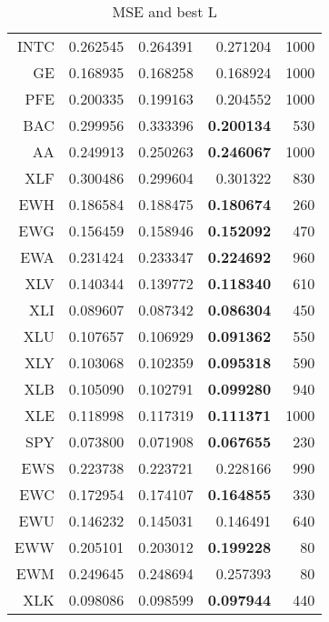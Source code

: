 \begin{table}[h!]
\begin{tabular}{*{5}{r}}
INTC  &  0.262545  &  0.264391  &  0.271204  &  1000\\
GE  &  0.168935  &  0.168258  &  0.168924  &  1000\\
PFE  &  0.200335  &  0.199163  &  0.204552  &  1000\\
BAC  &  0.299956  &  0.333396  &  \textbf{ 0.200134}  &  530\\
AA  &  0.249913  &  0.250263  &  \textbf{ 0.246067}  &  1000\\
XLF  &  0.300486  &  0.299604  &  0.301322  &  830\\
EWH  &  0.186584  &  0.188475  &  \textbf{ 0.180674}  &  260\\
EWG  &  0.156459  &  0.158946  &  \textbf{ 0.152092}  &  470\\
EWA  &  0.231424  &  0.233347  &  \textbf{ 0.224692}  &  960\\
XLV  &  0.140344  &  0.139772  &  \textbf{ 0.118340}  &  610\\
XLI  &  0.089607  &  0.087342  &  \textbf{ 0.086304}  &  450\\
XLU  &  0.107657  &  0.106929  &  \textbf{ 0.091362}  &  550\\
XLY  &  0.103068  &  0.102359  &  \textbf{ 0.095318}  &  590\\
XLB  &  0.105090  &  0.102791  &  \textbf{ 0.099280}  &  940\\
XLE  &  0.118998  &  0.117319  &  \textbf{ 0.111371} &  1000\\
SPY  &  0.073800  &  0.071908  &  \textbf{ 0.067655} &  230\\
EWS  &  0.223738  &  0.223721  &  0.228166  &  990\\
EWC  &  0.172954  &  0.174107  &  \textbf{ 0.164855} &  330\\
EWU  &  0.146232  &  0.145031  &  0.146491  &  640\\
EWW  &  0.205101  &  0.203012  &  \textbf{ 0.199228}  &  80\\
EWM  &  0.249645  &  0.248694  &  0.257393  &  80\\
XLK  &  0.098086  &  0.098599  &  \textbf{ 0.097944}  &  440  \\

        \bottomrule
    \end{tabular}
    \caption{MSE and best L}
    \label{tab:results}
\end{table}



